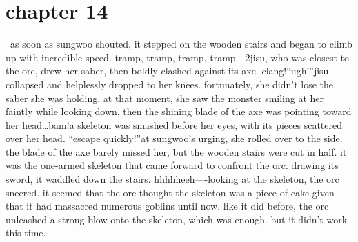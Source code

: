\section{chapter 14}






 as soon as sungwoo shouted, it stepped on the wooden stairs and began to climb up with incredible speed.
tramp, tramp, tramp, tramp—2jisu, who was closest to the orc, drew her saber, then boldly clashed against its axe.
clang!“ugh!”jisu collapsed and helplessly dropped to her knees.
 fortunately, she didn’t lose the saber she was holding.
at that moment, she saw the monster smiling at her faintly while looking down, then the shining blade of the axe was pointing toward her head…bam!a skeleton was smashed before her eyes, with its pieces scattered over her head.
“escape quickly!”at sungwoo’s urging, she rolled over to the side.
 the blade of the axe barely missed her, but the wooden stairs were cut in half.
it was the one-armed skeleton that came forward to confront the orc.
 drawing its sword, it waddled down the stairs.
hhhhheeh—-looking at the skeleton, the orc sneered.
 it seemed that the orc thought the skeleton was a piece of cake given that it had massacred numerous goblins until now.
like it did before, the orc unleashed a strong blow onto the skeleton, which was enough.
but it didn’t work this time.

